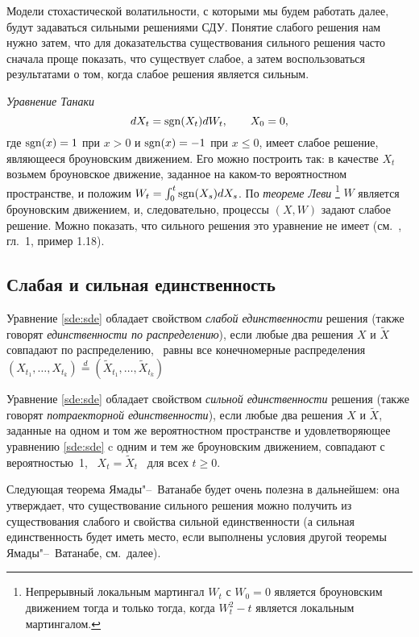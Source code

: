 Модели стохастической волатильности, с которыми мы будем работать далее, будут задаваться сильными решениями СДУ.
Понятие слабого решения нам нужно затем, что для доказательства существования сильного решения часто сначала проще показать, что существует слабое, а затем воспользоваться результатами о том, когда слабое решения является сильным.

\begin{example}
\emph{Уравнение Танаки} 
\[
dX_t = \operatorname{sgn}(X_t) d W_t, \qquad X_0=0,
\]
где $\operatorname{sgn}(x) = 1$ при $x> 0$ и $\operatorname{sgn}(x) = -1$ при $x\le0$, имеет слабое решение, являющееся броуновским движением. Его можно построить так: в качестве $X_t$ возьмем броуновское движение, заданное на каком-то вероятностном пространстве, и положим $W_t = \int_0^t \operatorname{sgn}(X_s) d X_s$. По \emph{теореме Леви}%
\footnote{Непрерывный локальным мартингал $W_t$ с $W_0=0$ является броуновским движением тогда и только тогда, когда $W_t^2 - t$ является локальным мартингалом.}
$W$ является броуновским движением, и, следовательно, процессы $(X,W)$ задают слабое решение.
Можно показать, что сильного решения это уравнение не имеет (см.~\cite{ChernyEngelbert}, гл.~1, пример 1.18).
\end{example}


\subsection{Слабая и сильная единственность}

\begin{definition}
Уравнение \eqref{sde:sde} обладает свойством \emph{слабой единственности} решения (также говорят \emph{единственности по распределению}), если любые два решения $X$ и $\tilde X$ совпадают по распределению, \te\ равны все конечномерные распределения $(X_{t_1},\dots,X_{t_k}) \stackrel{d}{=} (\tilde X_{t_1},\dots,\tilde X_{t_k})$
\end{definition}

\begin{definition}
Уравнение \eqref{sde:sde} обладает свойством \emph{сильной единственности} решения (также говорят \emph{потраекторной единственности}), если любые два решения $X$ и $\tilde X$, заданные на одном и том же вероятностном пространстве и удовлетворяющее уравнению \eqref{sde:sde} c одним и тем же броуновским движением, совпадают с вероятностью~1, \te\ $X_t=\tilde X_t$ \as\ для всех $t\ge 0$.
\end{definition}

Следующая теорема Ямады"--~Ватанабе будет очень полезна в дальнейшем: она утверждает, что существование сильного решения можно получить из существования слабого и свойства сильной единственности (а сильная единственность будет иметь место, если выполнены условия другой теоремы Ямады"--~Ватанабе, см.~далее).

